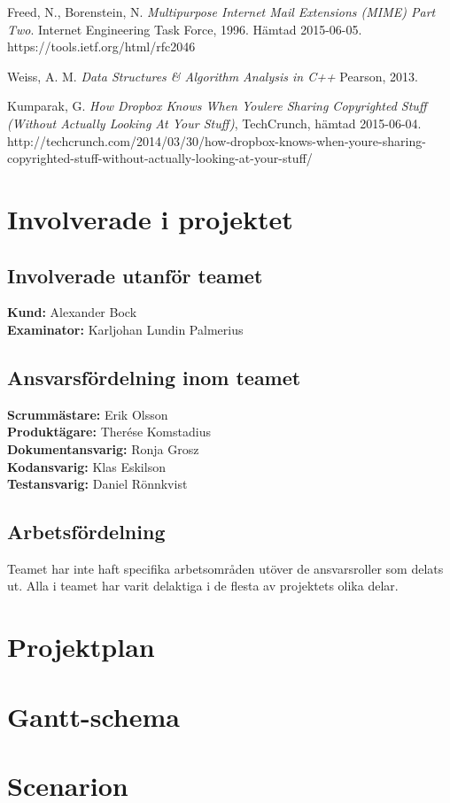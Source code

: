 \documentclass[a4paper,12pt,oneside,final]{extbook}
\begin{document}
\begin{thebibliography}{99}
  Freed, N., Borenstein, N.
  \emph{Multipurpose Internet Mail Extensions (MIME) Part Two}.
  Internet Engineering Task Force, 1996. Hämtad 2015-06-05.  https://tools.ietf.org/html/rfc2046

  Weiss, A. M.
  \emph{Data Structures \& Algorithm Analysis in C++}
  Pearson, 2013.

  Kumparak, G. \emph{How Dropbox Knows When Youlere Sharing Copyrighted Stuff (Without Actually Looking At Your Stuff)}, TechCrunch, hämtad 2015-06-04. http://techcrunch.com/2014/03/30/how-dropbox-knows-when-youre-sharing-copyrighted-stuff-without-actually-looking-at-your-stuff/

\end{thebibliography}


\appendix

\chapter{Involverade i projektet}
\section{Involverade utanför teamet}
\textbf{Kund:} Alexander Bock \\
\textbf{Examinator:} Karljohan Lundin Palmerius

\section{Ansvarsfördelning inom teamet}
\textbf{Scrummästare:} Erik Olsson \\
\textbf{Produktägare:} Therése Komstadius \\
\textbf{Dokumentansvarig:} Ronja Grosz \\
\textbf{Kodansvarig:} Klas Eskilson \\
\textbf{Testansvarig:} Daniel Rönnkvist

\section{Arbetsfördelning}
Teamet har inte haft specifika arbetsområden utöver de ansvarsroller som delats
ut. Alla i teamet har varit delaktiga i de flesta av projektets olika delar.

\chapter{Projektplan}

\chapter{Gantt-schema}

\chapter{Scenarion}

\end{document}
